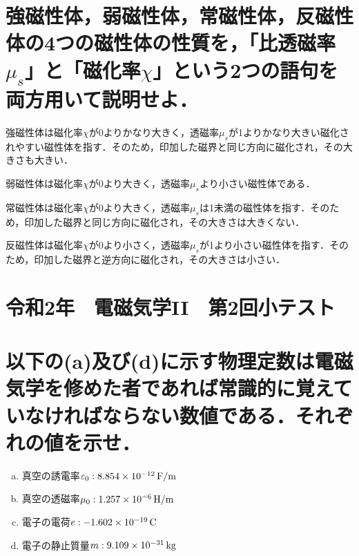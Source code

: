 \documentclass[dvipdfmx]{ujarticle}
\begin{document}
\section{強磁性体，弱磁性体，常磁性体，反磁性体の4つの磁性体の性質を，「比透磁率$\mu_{s}$」と「磁化率$\chi$」という2つの語句を両方用いて説明せよ．}
強磁性体は磁化率$\chi$が0よりかなり大きく，透磁率$\mu_{s}$が1よりかなり大きい磁化されやすい磁性体を指す．そのため，印加した磁界と同じ方向に磁化され，その大きさも大きい．

弱磁性体は磁化率$\chi$が0より大きく，透磁率$\mu_{s}$より小さい磁性体である．

常磁性体は磁化率$\chi$が0より大きく，透磁率$\mu_{s}$は1未満の磁性体を指す．そのため，印加した磁界と同じ方向に磁化され，その大きさは大きくない．

反磁性体は磁化率$\chi$が0より小さく，透磁率$\mu_{s}$が1より小さい磁性体を指す．そのため，印加した磁界と逆方向に磁化され，その大きさは小さい．

\clearpage
\setcounter{section}{0}
\section*{令和2年　電磁気学II　第2回小テスト}
\section{以下の(a)及び(d)に示す物理定数は電磁気学を修めた者であれば常識的に覚えていなければならない数値である．それぞれの値を示せ．}
\begin{enumerate}[(a)]
	\item 真空の誘電率$\varepsilon_{0}:8.854 \times 10^{-12}\,\rm{F/m}$
	\item 真空の透磁率$\mu_{0}:1.257 \times 10^{-6}\,\rm{H/m}$
	\item 電子の電荷$e:-1.602 \times 10^{-19}\,\rm{C}$
	\item 電子の静止質量$m:9.109\times 10^{-31}\,\rm{kg}$
\end{enumerate}
\end{document}
